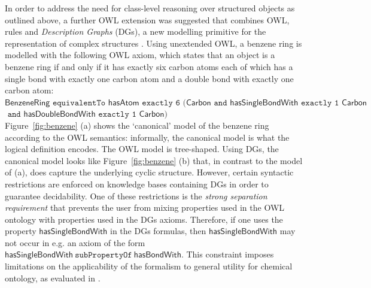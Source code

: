 \documentclass[10pt]{bmc_article}
\newenvironment{bmcformat}{\baselineskip20pt\sloppy\setboolean{publ}{false}}{\baselineskip20pt\sloppy}
\begin{document}
\begin{bmcformat}
In order to address the need for class-level reasoning over structured objects as outlined above, a further OWL extension was suggested that combines OWL, rules and \emph{Description Graphs} (DGs), a new modelling primitive for the representation of complex structures  \cite{mghs09graphs-journal}. Using unextended OWL, a benzene ring is modelled with the following OWL axiom, which states that an object is a benzene ring if and only if it has exactly six carbon atoms each of which has a single bond with exactly one carbon atom and a double bond with exactly one carbon atom:\\
$ \mathsf{BenzeneRing} \texttt{ equivalentTo } \mathsf{hasAtom} \texttt{ exactly 6 } (\mathsf{Carbon} \texttt{ and } \mathsf{hasSingleBondWith} \texttt{ exactly 1 } \mathsf{Carbon}$ \\
$ \texttt{ and } \mathsf{hasDoubleBondWith} \texttt{ exactly 1 } \mathsf{Carbon)}$\\
Figure~\ref{fig:benzene} (a) shows the `canonical' model of the benzene ring according to the OWL semantics: informally, the canonical model is what the logical definition encodes. The OWL model is tree-shaped. 
Using DGs, the canonical model looks like Figure~\ref{fig:benzene} (b) that, in contrast to the model of (a), does capture the underlying cyclic structure. 
However, certain syntactic restrictions are enforced on knowledge bases containing DGs in order to guarantee decidability. One of these restrictions is the \emph{strong separation requirement} that prevents the user from mixing properties used in the OWL ontology with properties used in the DGs axioms. Therefore, if one uses the property $\mathsf{hasSingleBondWith}$ in the DGs formulas, then $\mathsf{hasSingleBondWith}$ may not occur in e.g. an axiom of the form $\mathsf{hasSingleBondWith} ~\texttt{subPropertyOf}~ \mathsf{hasBondWith}$. This constraint imposes limitations on the applicability of the formalism to general utility for chemical ontology, as evaluated in \cite{hastingsowled2010}.


\end{bmcformat}
\end{document}
